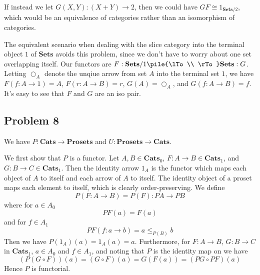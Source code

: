 \documentclass{article}
\newcommand{\mbf}{\mathbf}
\begin{document}
If instead we let $G(X,Y) : (X + Y) \to 2$, then we could have $GF \cong 1_{\mbf{Sets}/2}$, which
would be an equivalence of categories rather than an isomorphism of categories.

The equivalent scenario when dealing with the slice category into the terminal object $1$ of $\mbf{Sets}$
avoids this problem, since we don't have to worry about one set overlapping itself.
Our functors are $F : \mbf{Sets}/1 \pile{\lTo \\ \rTo} \mbf{Sets} : G$.
Letting $\bigcirc_A$ denote the unqiue arrow from set $A$ into the terminal set $1$, we have
$F(f : A \to 1) = A$, $F(r : A \to B) = r$, $G(A) = \bigcirc_A$, and $G(f : A \to B) = f$.
It's easy to see that $F$ and $G$ are an iso pair.

\subsection{Problem 8}

We have $P : \mbf{Cats} \to \mbf{Prosets}$ and $U : \mbf{Prosets} \to \mbf{Cats}$.

We first show that $P$ is a functor. Let $A,B \in \mbf{Cats}_0$, $F : A \to B \in \mbf{Cats}_1$,
and $G : B \to C \in \mbf{Cats}_1$. Then the identity arrow $1_A$ is the functor which maps each
object of $A$ to itself and each arrow of $A$ to itself. The identity object of a proset maps
each element to itself, which is clearly order-preserving. We define
$$P(F : A \to B) = P(F) : PA \to PB$$
where for $a \in A_0$
$$PF(a) = F(a)$$
and for $f \in A_1$
$$PF(f : a \to b) = a \leq_{P(B)} b$$
Then we have $P(1_A)(a) = 1_A(a) = a$.
Furthermore, for $F : A \to B$, $G : B \to C$ in $\mbf{Cats}_1$, $a \in A_0$ and $f \in A_1$, and noting
that $P$ is the identity map on  we have
$$(P(G \circ F))(a) = (G \circ F)(a) = G(F(a)) = (PG \circ PF)(a) $$
Hence $P$ is functorial.
\end{document}
